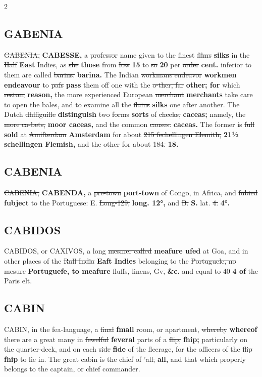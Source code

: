\documentclass[10pt]{article}
\begin{document}
\begin{multicols}{2}
\subsection*{GABENIA}
\sout{GABENIA,} \textbf{CABESSE,} a \sout{professor} name given to the finest \sout{films} \textbf{silks} in the \sout{Half} \textbf{East} Indies, as \sout{she} \textbf{those} from \sout{Iow} \textbf{15} to \sout{so} \textbf{20} per \sout{order} \textbf{cent.} inferior to them are called \sout{barins.} \textbf{barina.} The Indian \sout{workmans endeavor} \textbf{workmen endeavour} to \sout{pafs} \textbf{pass} them off one with the \sout{o-ther, far} \textbf{other; for} which \sout{reston,} \textbf{reason,} the more experienced European \sout{merchant} \textbf{merchants} take care to open the bales, and to examine all the \sout{flains} \textbf{silks} one after another. The Dutch \sout{dhlfiguille} \textbf{distinguish} two \sout{forms} \textbf{sorts} of \sout{cheeks,} \textbf{caceas;} namely, the \sout{more ca-bets,} \textbf{moor caceas,} and the common \sout{causes.} \textbf{caceas.} The former is \sout{full} \textbf{sold} at \sout{Amifterdam} \textbf{Amsterdam} for about \sout{215 fechellingen Elemith,} \textbf{21½ schellingen Flemish,} and the other for about \sout{184.} \textbf{18.}

\subsection*{CABENIA}
\sout{CABENIA,} \textbf{CABENDA,} a \sout{pre-town} \textbf{port-town} of Congo, in Africa, and \sout{fubied} \textbf{fubject} to the Portuguese: E. \sout{Long-129,} \textbf{long. 12°,} and \sout{B.} \textbf{S.} lat. \sout{4.} \textbf{4°.}

\subsection*{CABIDOS}
CABIDOS, or CAXIVOS, a long \sout{mesmer called} \textbf{meafure ufed} at Goa, and in other places of the \sout{Rall India} \textbf{Eaft Indies} belonging to the \sout{Portuguele, no mesure} \textbf{Portuguefe, to meafure} fluffs, linens, \sout{Gv,} \textbf{\&c.} and equal to \sout{40} \textbf{4 of} the Paris elt.

\subsection*{CABIN}
CABIN, in the fea-language, a \sout{final} \textbf{fmall} room, or apartment, \sout{whereby} \textbf{whereof} there are a great many in \sout{fewelful} \textbf{feveral} parts of a \sout{flip,} \textbf{fhip;} particularly on the quarter-deck, and on each \sout{side} \textbf{fide} of the fleerage, for the officers of the \sout{flip} \textbf{fhip} to lie in. The great cabin is the chief of \sout{’all,} \textbf{all,} and that which properly belongs to the captain, or chief commander.


\end{multicols}
\end{document}
